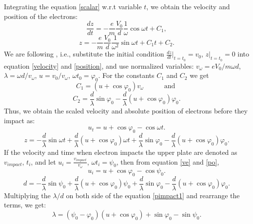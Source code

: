 \documentclass[a4paper,11pt]{article}
\begin{document}
Integrating the equation \eqref{scalar} w.r.t variable $t$, we obtain the velocity and position of the electrons:
\begin{equation}
\frac{dz}{dt} =- \frac{e}{m}\frac{V_0}{d}\frac{1}{\omega}\cos\omega t + C_1,\label{velocity}
\end{equation}
\begin{equation}
z = - \frac{e}{m}\frac{V_0}{d}\frac{1}{\omega^2}\sin\omega t+C_1t+C_2.\label{position}
\end{equation}
We are following \cite{PP}, i.e., substitute the initial condition $\frac{dz}{dt}|_{t=t_0}=v_{0}$, $z|_{t=t_0}=0$ into equation \eqref{velocity} and \eqref{position}, and use normalized variables:  $v_{\omega}=eV_0/m\omega d $, $\lambda=\omega d/v_{\omega}$, $u=v_{0}/v_{\omega}$, $\omega t_0=\varphi_0$. For the constants $C_1$ and $C_2$ we get
\begin{equation}
C_1=(u+\cos\varphi_0)v_{\omega} \text{ ~~~~~~~~and }\label{C1}
\end{equation}
\begin{equation}
C_2=\frac{d}{\lambda}\sin\varphi_0-\frac{d}{\lambda}(u+\cos\varphi_0)\varphi_0.\label{C2}
\end{equation}
Thus, we obtain the scaled velocity and absolute position of electrons before they impact as: 
 \begin{equation}
u_t=u+\cos\varphi_0-\cos\omega t.\label{ve}
\end{equation}
\begin{equation}
z=-\frac{d}{\lambda}\sin\omega t+\frac{d}{\lambda}(u+\cos\varphi_0)\omega t+\frac{d}{\lambda}\sin\varphi_0-\frac{d}{\lambda}(u+\cos\varphi_0)\varphi_0.\label{po}
\end{equation}
If the velocity and time when electron impacts the upper plate are denoted as $v_{impact}$, $t_i$, and let $u_i= \frac{v_{impact}}{v_{\omega}}$, $\omega t_i=\psi_0$, then from equation \eqref{ve} and \eqref{po}, 
\begin{equation}
u_i=u+\cos\varphi_0-\cos\psi_0.\label{vimpact}
\end{equation}
\begin{equation}
d=-\frac{d}{\lambda}\sin\psi_0+\frac{d}{\lambda}(u+\cos\varphi_0)\psi_0+\frac{d}{\lambda}\sin\varphi_0-\frac{d}{\lambda}(u+\cos\varphi_0)\varphi_0.\label{pimpact1}
\end{equation}
Multiplying the $\lambda/d$ on both side of the equation \eqref{pimpact1} and rearrange the terms, we get:
\begin{equation}
\lambda=(\psi_0-\varphi_0)(u+\cos\varphi_0)+\sin\varphi_0-\sin\psi_0.\label{pimpact}
\end{equation}
\end{document}
